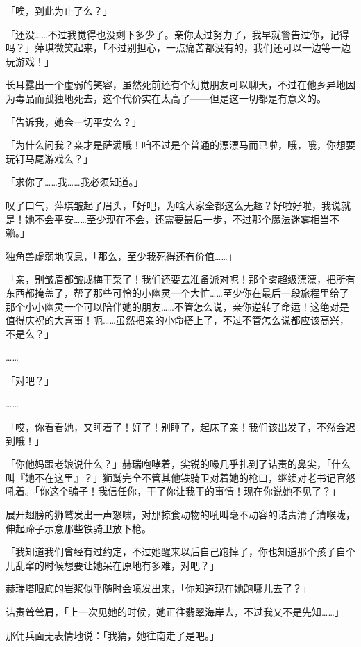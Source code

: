 「唉，到此为止了么？」

「还没……不过我觉得也没剩下多少了。亲你太过努力了，我早就警告过你，记得吗？」萍琪微笑起来，「不过别担心，一点痛苦都没有的，我们还可以一边等一边玩游戏！」

长耳露出一个虚弱的笑容，虽然死前还有个幻觉朋友可以聊天，不过在他乡异地因为毒品而孤独地死去，这个代价实在太高了——但是这一切都是有意义的。

「告诉我，她会一切平安么？」

「为什么问我？亲才是萨满哦！咱不过是个普通的漂漂马而已啦，哦，哦，你想要玩钉马尾游戏么？」

「求你了……我……我必须知道。」

叹了口气，萍琪皱起了眉头，「好吧，为啥大家全都这么无趣？好啦好啦，我说就是！她不会平安……至少现在不会，还需要最后一步，不过那个魔法迷雾相当不赖。」

独角兽虚弱地叹息，「那么，至少我死得还有价值……」

「亲，别皱眉都皱成梅干菜了！我们还要去准备派对呢！那个雾超级漂漂，把所有东西都掩盖了，帮了那些可怜的小幽灵一个大忙……至少你在最后一段旅程里给了那个小小幽灵一个可以陪伴她的朋友……不管怎么说，亲你逆转了命运！这绝对是值得庆祝的大喜事！呃……虽然把亲的小命搭上了，不过不管怎么说都应该高兴，不是么？」

……{}

「对吧？」

……{}

「哎，你看看她，又睡着了！好了！别睡了，起床了亲！我们该出发了，不然会迟到哦！」

\horizonline


「你他妈跟老娘说什么？」赫瑞咆哮着，尖锐的喙几乎扎到了诘责的鼻尖，「什么叫『她不在这里』？」狮鹫完全不管其他铁骑卫对着她的枪口，继续对老书记官怒吼着。「你这个骗子！我信任你，干了你让我干的事情！现在你说她不见了？」

展开翅膀的狮鹫发出一声怒啸，对那掠食动物的吼叫毫不动容的诘责清了清喉咙，伸起蹄子示意那些铁骑卫放下枪。

「我知道我们曾经有过约定，不过她醒来以后自己跑掉了，你也知道那个孩子自个儿乱窜的时候想要让她呆在原地有多难，对吧？」

赫瑞塔眼底的岩浆似乎随时会喷发出来，「你知道现在她跑哪儿去了？」

诘责耸耸肩，「上一次见她的时候，她正往翡翠海岸去，不过我又不是先知……」

那佣兵面无表情地说：「我猜，她往南走了是吧。」

